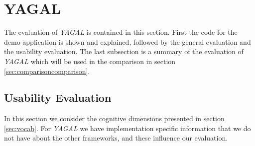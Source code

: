 \section{YAGAL}
The evaluation of \textit{YAGAL} is contained in this section. First the code for the demo application is shown and explained, followed by the general evaluation and the usability evaluation. The last subsection is a summary of the evaluation of \textit{YAGAL} which will be used in the comparison in section \ref{sec:comparisoncomparison}.






\subsection{Usability Evaluation}
In this section we consider the cognitive dimensions presented in section \ref{sec:vocab}. For \textit{YAGAL} we have implementation specific information that we do not have about the other frameworks, and these influence our evaluation.

